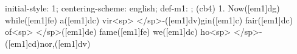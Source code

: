 initial-style: 1;
centering-scheme: english;
def-m1: \grealign;
(cb4) 1. Now([em1]dg) while([em1]fe) a([em1]dc) vir<sp> </sp>-([em1]dv)gin([em1]c) fair([em1]dc) of<sp> </sp>([em1]de) fame([em1]fe) we([em1]dc) ho<sp> </sp>-([em1]cd)nor,([em1]dv)